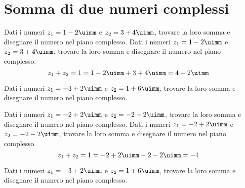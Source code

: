  \section{Somma di due numeri complessi}
 \begin{exercise}
Dati i numeri $z_1=1-2\uimm$ e $z_2=3+4\uimm$, trovare la loro somma e  disegnare il numero nel piano complesso.
\tcblower
Dati i numeri $z_1=1-2\uimm$ e $z_2=3+4\uimm$, trovare la loro somma e  disegnare il numero nel piano complesso.
\[z_1+z_2=1=1-2\uimm+3+4\uimm=4+2\uimm \]
\begin{center}

\label{fig:disegnopianocomplesso07}
\end{center}
 \end{exercise}
 \begin{exercise}[no solution]
Dati i numeri $z_1=-3+2\uimm$ e $z_2=1+6\uimm$, trovare la loro somma e  disegnare il numero nel piano complesso.
 \end{exercise}
 \begin{exercise}
 	Dati i numeri $z_1=-2+2\uimm$ e $z_2=-2-2\uimm$, trovare la loro somma e  disegnare il numero nel piano complesso.
 	\tcblower
 	Dati i numeri $z_1=-2+2\uimm$ e $z_2=-2-2\uimm$, trovare la loro somma e  disegnare il numero nel piano complesso.
 \[z_1+z_2=1=-2+2\uimm-2-2\uimm=-4\]
 	\begin{center}
 		
 		\label{fig:disegnopianocomplesso08}
 	\end{center}
 \end{exercise}
 \begin{exercise}[no solution]
 	Dati i numeri $z_1=-3+2\uimm$ e $z_2=1+6\uimm$, trovare la loro somma e  disegnare il numero nel piano complesso.
 \end{exercise}

 